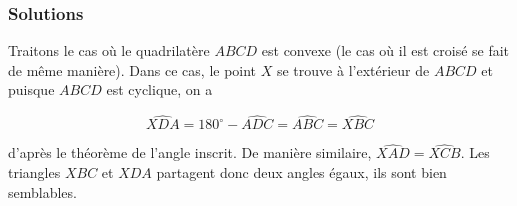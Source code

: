 \subsubsection{Solutions}


\begin{sol}
\begin{center}
\end{center}

Traitons le cas où le quadrilatère $ ABCD$ est convexe (le cas où il est croisé se fait de même manière). Dans ce cas, le point $X$ se trouve à l'extérieur de $ABCD$ et puisque $ABCD$ est cyclique, on a

$$\widehat{XDA} = 180^\circ - \widehat{ADC} = \widehat{ABC} = \widehat{XBC}$$

d'après le théorème de l'angle inscrit. De manière similaire, $\widehat{XAD} = \widehat{XCB}$. Les triangles $XBC$ et $XDA$ partagent donc deux angles égaux, ils sont bien semblables.
\end{sol}


